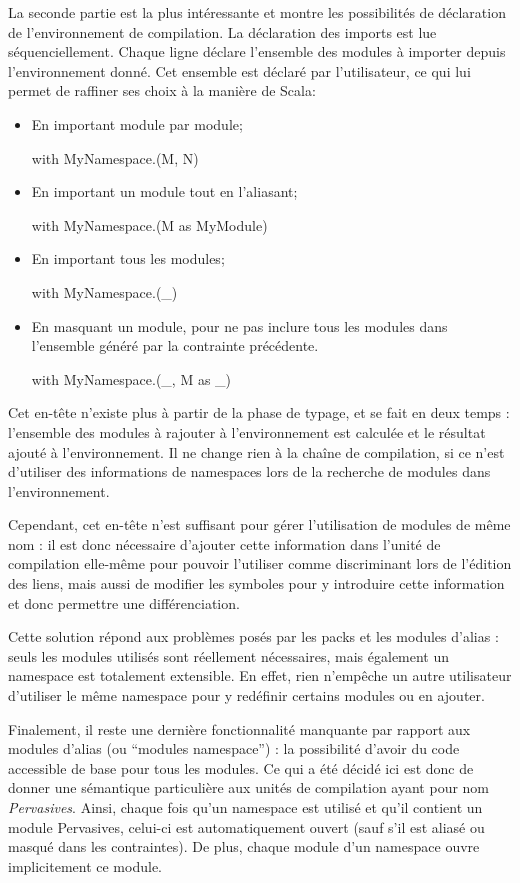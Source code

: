 \documentclass[11pt,a4paper]{report}
\begin{document}
La seconde partie est la plus intéressante et montre les possibilités de
déclaration de l'environnement de compilation. La déclaration des imports est
lue séquenciellement. Chaque ligne déclare l'ensemble des modules à importer
depuis l'environnement donné. Cet ensemble est déclaré par l'utilisateur, ce qui
lui permet de raffiner ses choix à la manière de Scala:
\begin{itemize}
\item En important module par module;
\begin{OCaml}
with MyNamespace.(M, N)
\end{OCaml}
\item En important un module tout en l'aliasant;
\begin{OCaml}
with MyNamespace.(M as MyModule) 
\end{OCaml}
\item En important tous les modules;
\begin{OCaml}
with MyNamespace.(_)
\end{OCaml}
\item En masquant un module, pour ne pas inclure tous les modules dans
  l'ensemble généré par la contrainte précédente.
\begin{OCaml}
with MyNamespace.(_, M as _)
\end{OCaml}
\end{itemize}

Cet en-tête n'existe plus à partir de la phase de typage, et se fait en deux
temps : l'ensemble des modules à rajouter à l'environnement est calculée et le
résultat ajouté à l'environnement. Il ne change rien à la chaîne de compilation,
si ce n'est d'utiliser des informations de namespaces lors de la recherche de
modules dans l'environnement.

Cependant, cet en-tête n'est suffisant pour gérer l'utilisation de modules de
même nom : il est donc nécessaire d'ajouter cette information dans l'unité de
compilation elle-même pour pouvoir l'utiliser comme discriminant lors de
l'édition des liens, mais aussi de modifier les symboles pour y introduire cette
information et donc permettre une différenciation.

Cette solution répond aux problèmes posés par les packs et les modules d'alias :
seuls les modules utilisés sont réellement nécessaires, mais également un
namespace est totalement extensible. En effet, rien n'empêche un autre
utilisateur d'utiliser le même namespace pour y redéfinir certains modules ou en
ajouter.

Finalement, il reste une dernière fonctionnalité manquante par rapport aux 
modules d'alias (ou ``modules namespace'') : la possibilité d'avoir du code 
accessible de base pour tous les modules. Ce qui a été décidé ici est donc de
donner une sémantique particulière aux unités de compilation ayant pour nom
\emph{Pervasives}. Ainsi, chaque fois qu'un namespace est utilisé et qu'il
contient un module Pervasives, celui-ci est automatiquement ouvert (sauf s'il
est aliasé ou masqué dans les contraintes). De plus, chaque module d'un
namespace ouvre implicitement ce module.
\end{document}
